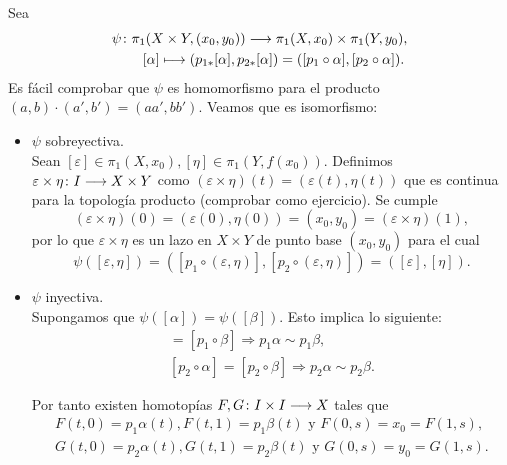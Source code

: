 \documentclass[GTS.tex]{subfiles}
\begin{document}
\begin{dem}
Sea
\begin{gather*}
\psi\colon{\pi_1(X\times Y, (x_0,y_0))}\longrightarrow{\pi_1(X,x_0)\times\pi_1(Y,y_0)},\\
\qquad[\alpha]\longmapsto(p_{1*}[\alpha],p_{2*}[\alpha])=([p_1\circ\alpha],[p_2\circ\alpha]).
\end{gather*}
Es fácil comprobar que $\psi$ es homomorfismo para el producto $(a,b)\cdot(a',b')=(aa',bb')$. Veamos que es isomorfismo:
\begin{itemize}
\item $\psi$ sobreyectiva.\\
Sean $[\varepsilon]\in\pi_1(X,x_0),[\eta]\in\pi_1(Y,f(x_0))$. Definimos $\varepsilon\times\eta\colon{I}\longrightarrow{X\times Y}$ como $(\varepsilon\times\eta)(t)=(\varepsilon(t),\eta(t))$ que es continua para la topología producto (comprobar como ejercicio). Se cumple
\[
(\varepsilon\times\eta)(0)=(\varepsilon(0),\eta(0))=(x_0,y_0)=(\varepsilon\times\eta)(1),
\]
por lo que $\varepsilon\times\eta$ es un lazo en $X\times Y$ de punto base $(x_0,y_0)$ para el cual
\[
\psi([\varepsilon,\eta])=([p_1\circ(\varepsilon,\eta)],[p_2\circ(\varepsilon,\eta)])=([\varepsilon],[\eta]).
\]
\item $\psi$ inyectiva.\\
Supongamos que $\psi([\alpha])=\psi([\beta])$. Esto implica lo siguiente:
\begin{gather*}
[p_1\circ\alpha]=[p_1\circ\beta]\Rightarrow p_1\alpha\sim p_1\beta,\\
[p_2\circ\alpha]=[p_2\circ\beta]\Rightarrow p_2\alpha\sim p_2\beta.
\end{gather*}

Por tanto existen homotopías $F,G\colon{I\times I}\longrightarrow{X}$ tales que
\begin{gather*}
F(t,0)=p_1\alpha(t), F(t,1)=p_1\beta(t) \mbox{ y } F(0,s)=x_0=F(1,s),\\
G(t,0)=p_2\alpha(t), G(t,1)=p_2\beta(t) \mbox{ y } G(0,s)=y_0=G(1,s).
\end{gather*}





\end{itemize}
\end{dem}
\end{document}
